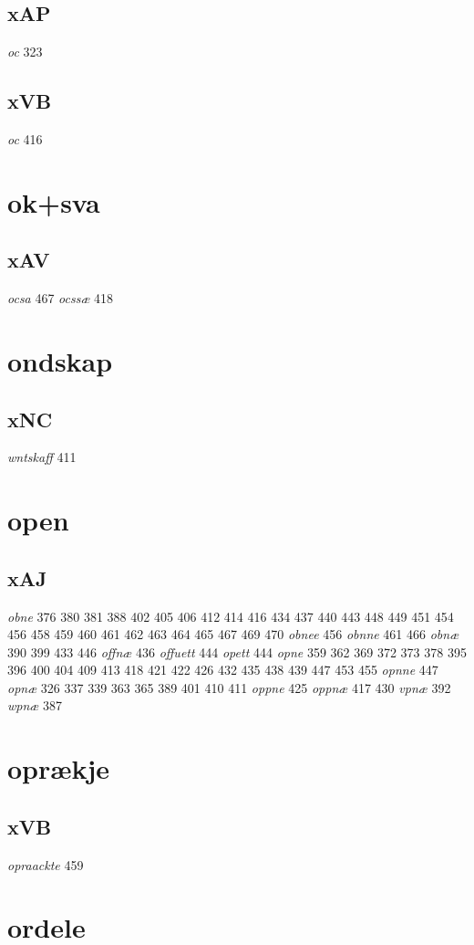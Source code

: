 \documentclass[a4paper,twocolumn]{article}
\begin{document}
\subsection{xAP}
\label{sec:org6c13c52}
\emph{oc} 323 
\subsection{xVB}
\label{sec:org3470d95}
\emph{oc} 416 
\section{ok+sva}
\label{sec:org1364fa0}
\subsection{xAV}
\label{sec:org58350dc}
\emph{ocsa} 467 \emph{ocssæ} 418 
\section{ondskap}
\label{sec:org790895f}
\subsection{xNC}
\label{sec:orgf06da14}
\emph{wntskaff} 411 
\section{open}
\label{sec:org5c53d98}
\subsection{xAJ}
\label{sec:orgaf7859d}
\emph{obne} 376 380 381 388 402 405 406 412 414 416 434 437 440 443 448 449 451 454 456 458 459 460 461 462 463 464 465 467 469 470 \emph{obnee} 456 \emph{obnne} 461 466 \emph{obnæ} 390 399 433 446 \emph{offnæ} 436 \emph{offuett} 444 \emph{opett} 444 \emph{opne} 359 362 369 372 373 378 395 396 400 404 409 413 418 421 422 426 432 435 438 439 447 453 455 \emph{opnne} 447 \emph{opnæ} 326 337 339 363 365 389 401 410 411 \emph{oppne} 425 \emph{oppnæ} 417 430 \emph{vpnæ} 392 \emph{wpnæ} 387 
\section{oprækje}
\label{sec:orgc3dc7d5}
\subsection{xVB}
\label{sec:orgddd6b52}
\emph{opraackte} 459 
\section{ordele}
\label{sec:orgd7f5001}
\end{document}
